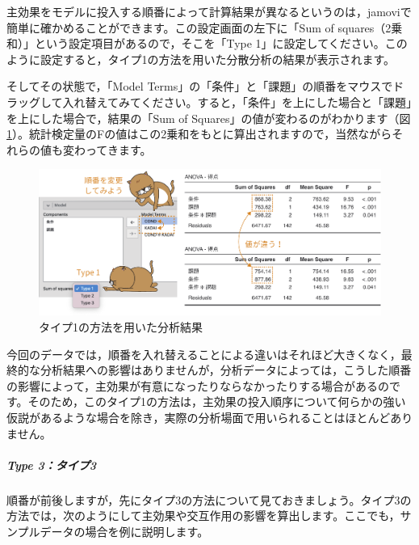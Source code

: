 \documentclass[
  12pt,
  a5jpaper,
  lualatex, ja=standard]{bxjsbook}
\begin{document}
主効果をモデルに投入する順番によって計算結果が異なるというのは，jamoviで簡単に確かめることができます。この設定画面の左下に「Sum of squares（2乗和）」という設定項目があるので，そこを「Type 1」に設定してください。このように設定すると，タイプ1の方法を用いた分散分析の結果が表示されます。

そしてその状態で，「Model Terms」の「条件」と「課題」の順番をマウスでドラッグして入れ替えてみてください。すると，「条件」を上にした場合と「課題」を上にした場合で，結果の「Sum of Squares」の値が変わるのがわかります（図\ref{fig:ANOVA-anova-model-type1}）。統計検定量のFの値はこの2乗和をもとに算出されますので，当然ながらそれらの値も変わってきます。

\begin{figure}[!ht]

{\centering \includegraphics[width=1\linewidth]{images/ANOVA/anova-model-type1} 

}

\caption{タイプ1の方法を用いた分析結果}\label{fig:ANOVA-anova-model-type1}
\end{figure}

今回のデータでは，順番を入れ替えることによる違いはそれほど大きくなく，最終的な分析結果への影響はありませんが，分析データによっては，こうした順番の影響によって，主効果が有意になったりならなかったりする場合があるのです。そのため，このタイプ1の方法は，主効果の投入順序について何らかの強い仮説があるような場合を除き，実際の分析場面で用いられることはほとんどありません。

\hypertarget{type-3ux30bfux30a4ux30d73}{%
\subparagraph*{Type 3：タイプ3}\label{type-3ux30bfux30a4ux30d73}}

順番が前後しますが，先にタイプ3の方法について見ておきましょう。タイプ3の方法では，次のようにして主効果や交互作用の影響を算出します。ここでも，サンプルデータの場合を例に説明します。
\end{document}
